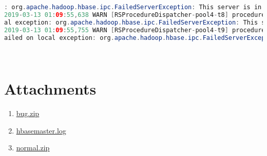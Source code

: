\documentclass{report}%
\begin{document}
\begin{lstlisting}[language=java]
: org.apache.hadoop.hbase.ipc.FailedServerException: This server is in the failed servers list: hadoop14/172.16.1.131:16020, try=6, retrying...
2019-03-13 01:09:55,638 WARN [RSProcedureDispatcher-pool4-t8] procedure.RSProcedureDispatcher: request to server hadoop14,16020,1552410583724 failed due to org.apache.hadoop.hbase.ipc.FailedServerException: Call to hadoop14/172.16.1.131:16020 failed on loc
al exception: org.apache.hadoop.hbase.ipc.FailedServerException: This server is in the failed servers list: hadoop14/172.16.1.131:16020, try=7, retrying...
2019-03-13 01:09:55,755 WARN [RSProcedureDispatcher-pool4-t9] procedure.RSProcedureDispatcher: request to server hadoop14,16020,1552410583724 failed due to org.apache.hadoop.hbase.ipc.FailedServerException: Call to hadoop14/172.16.1.131:16020 f
ailed on local exception: org.apache.hadoop.hbase.ipc.FailedServerException: This server is in the failed servers list: hadoop14/172.16.1.131:16020, try=8, retrying...

\end{lstlisting} \ 

%
\section{Attachments}%
\label{sec:Attachments}%
\begin{enumerate}%
\item%
\href{https://issues.apache.org/jira/secure/attachment/12962095/bug.zip}{\underline{bug.zip}}%
\item%
\href{https://issues.apache.org/jira/secure/attachment/13003680/hbasemaster.log}{\underline{hbasemaster.log}}%
\item%
\href{https://issues.apache.org/jira/secure/attachment/12962093/normal.zip}{\underline{normal.zip}}%
\end{enumerate}

%
\end{document}
